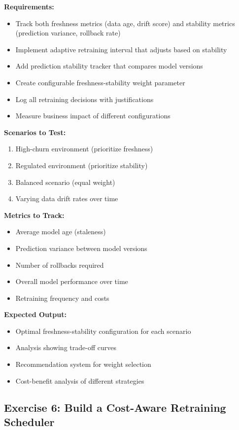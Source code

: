 \textbf{Requirements:}
\begin{itemize}
    \item Track both freshness metrics (data age, drift score) and stability metrics (prediction variance, rollback rate)
    \item Implement adaptive retraining interval that adjusts based on stability
    \item Add prediction stability tracker that compares model versions
    \item Create configurable freshness-stability weight parameter
    \item Log all retraining decisions with justifications
    \item Measure business impact of different configurations
\end{itemize}

\textbf{Scenarios to Test:}
\begin{enumerate}
    \item High-churn environment (prioritize freshness)
    \item Regulated environment (prioritize stability)
    \item Balanced scenario (equal weight)
    \item Varying data drift rates over time
\end{enumerate}

\textbf{Metrics to Track:}
\begin{itemize}
    \item Average model age (staleness)
    \item Prediction variance between model versions
    \item Number of rollbacks required
    \item Overall model performance over time
    \item Retraining frequency and costs
\end{itemize}

\textbf{Expected Output:}
\begin{itemize}
    \item Optimal freshness-stability configuration for each scenario
    \item Analysis showing trade-off curves
    \item Recommendation system for weight selection
    \item Cost-benefit analysis of different strategies
\end{itemize}

\subsection{Exercise 6: Build a Cost-Aware Retraining Scheduler}

